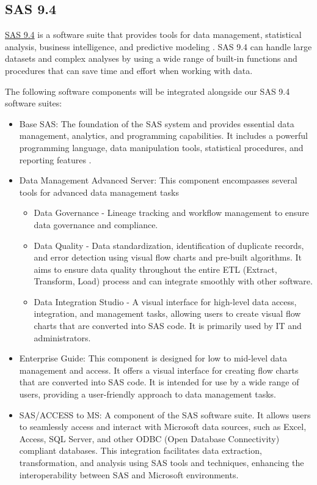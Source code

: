 \subsection{SAS 9.4}
\href{https://documentation.sas.com/doc/en/pgmsascdc/9.4_3.5/whatsnew/n17cszme3e52b4n1ooe3710fnuec.htm#:~:text=For%20SAS%20administrators%2C%20SAS%209.4,more%20complete%20data%20management%20solution.}{SAS 9.4} is a software suite that provides tools for data management, statistical analysis, business intelligence, and predictive modeling \cite{SAS3}. SAS 9.4 can handle large datasets and complex analyses by using a wide range of built-in functions and procedures that can save time and effort when working with data. 

The following software components will be integrated alongside our SAS 9.4 software suites:

\begin{itemize}
        \item Base SAS: The foundation of the SAS system and provides essential data management, analytics, and programming capabilities. It includes a powerful programming language, data manipulation tools, statistical procedures, and reporting features \cite{SAS1}.
        \item Data Management Advanced Server: This component encompasses several tools for advanced data management tasks
        \begin{itemize}
            \item Data Governance - Lineage tracking and workflow management to ensure data governance and compliance.
            \item Data Quality - Data standardization, identification of duplicate records, and error detection using visual flow charts and pre-built algorithms. It aims to ensure data quality throughout the entire ETL (Extract, Transform, Load) process and can integrate smoothly with other software.
            \item Data Integration Studio - A visual interface for high-level data access, integration, and management tasks, allowing users to create visual flow charts that are converted into SAS code. It is primarily used by IT and administrators.
        \end{itemize}
        \item Enterprise Guide:  This component is designed for low to mid-level data management and access. It offers a visual interface for creating flow charts that are converted into SAS code. It is intended for use by a wide range of users, providing a user-friendly approach to data management tasks.
        \item SAS/ACCESS to MS: A component of the SAS software suite. It allows users to seamlessly access and interact with Microsoft data sources, such as Excel, Access, SQL Server, and other ODBC (Open Database Connectivity) compliant databases. This integration facilitates data extraction, transformation, and analysis using SAS tools and techniques, enhancing the interoperability between SAS and Microsoft environments.
    \end{itemize}

